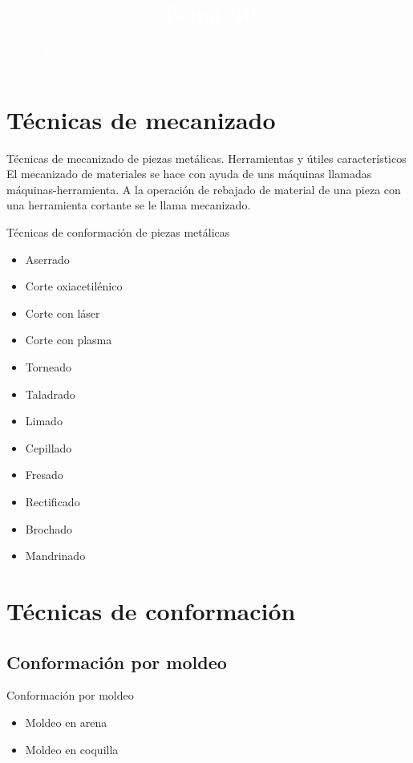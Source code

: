 \documentclass{beamer}
\title{\textcolor{white}{Tema 40}}
\subtitle{\textcolor{white}{Técnicas de mecanizado, conformación y unión de piezas metálicas.}}
\begin{document}
\begin{frame}[plain,t]
\titlepage
\end{frame}



\section{Técnicas de mecanizado}
\begin{frame}{Técnicas de mecanizado de piezas metálicas. Herramientas y útiles característicos}
    El mecanizado de materiales se hace con ayuda de uns máquinas llamadas máquinas-herramienta.
    A la operación de rebajado de material de una pieza con una herramienta cortante se le llama mecanizado. 
    

\end{frame}


\begin{frame}{Técnicas de conformación de piezas metálicas}
  \begin{itemize}
      \item Aserrado
      \item Corte oxiacetilénico
      \item Corte con láser
      \item Corte con plasma
      \item Torneado
      \item Taladrado
      \item Limado
      \item Cepillado
      \item Fresado
      \item Rectificado
      \item Brochado
      \item Mandrinado
  \end{itemize}
    
    \end{frame}

    \section{Técnicas de conformación}

\subsection{Conformación por moldeo}
\begin{frame}{Conformación por moldeo}
    \begin{itemize}
        \item Moldeo en arena
        \item Moldeo en coquilla
    \end{itemize}
\end{frame}
\end{document}
